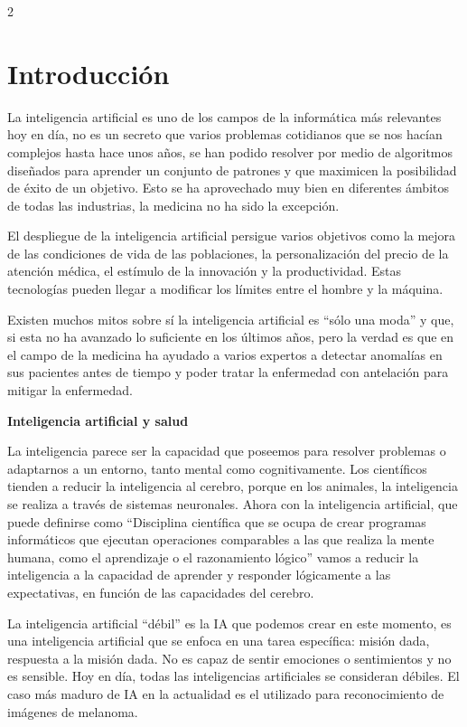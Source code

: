 \documentclass[12pt,spanish,Letterpaper,openany]{book}
\begin{document}
\begin {multicols}{2}

\hypertarget{introducciuxf3n-1}{%
\section{Introducción}\label{introducciuxf3n-1}}

La inteligencia artificial es uno de los campos de la informática más relevantes hoy en día, no es un secreto que varios problemas cotidianos que se nos hacían complejos hasta hace unos años, se han podido resolver por medio de algoritmos diseñados para aprender un conjunto de patrones y que maximicen la posibilidad de éxito de un objetivo. Esto se ha aprovechado muy bien en diferentes ámbitos de todas las industrias, la medicina no ha sido la excepción.

El despliegue de la inteligencia artificial persigue varios objetivos como la mejora de las condiciones de vida de las poblaciones, la personalización del precio de la atención médica, el estímulo de la innovación y la productividad. Estas tecnologías pueden llegar a modificar los límites entre el hombre y la máquina.

Existen muchos mitos sobre sí la inteligencia artificial es ``sólo una moda'' y que, si esta no ha avanzado lo suficiente en los últimos años, pero la verdad es que en el campo de la medicina ha ayudado a varios expertos a detectar anomalías en sus pacientes antes de tiempo y poder tratar la enfermedad con antelación para mitigar la enfermedad.

\textbf{Inteligencia artificial y salud}

La inteligencia parece ser la capacidad que poseemos para resolver problemas o adaptarnos a un entorno, tanto mental como cognitivamente. Los científicos tienden a reducir la inteligencia al cerebro, porque en los animales, la inteligencia se realiza a través de sistemas neuronales. Ahora con la inteligencia artificial, que puede definirse como ``Disciplina científica que se ocupa de crear programas informáticos que ejecutan operaciones comparables a las que realiza la mente humana, como el aprendizaje o el razonamiento lógico'' vamos a reducir la inteligencia a la capacidad de aprender y responder lógicamente a las expectativas, en función de las capacidades del cerebro.

La inteligencia artificial ``débil'' es la IA que podemos crear en este momento, es una inteligencia artificial que se enfoca en una tarea específica: misión dada, respuesta a la misión dada. No es capaz de sentir emociones o sentimientos y no es sensible. Hoy en día, todas las inteligencias artificiales se consideran débiles. El caso más maduro de IA en la actualidad es el utilizado para reconocimiento de imágenes de melanoma.


\end{multicols}
\end{document}
